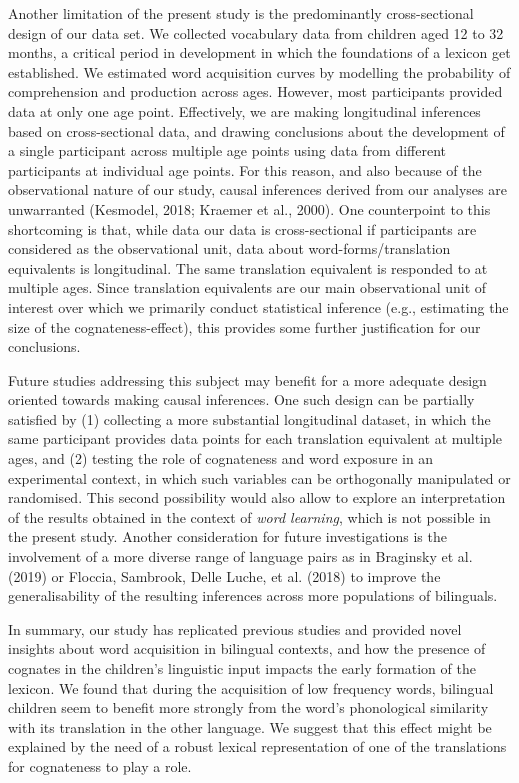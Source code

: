 \documentclass[
  man,
  floatsintext,
  colorlinks=true,linkcolor=blue,citecolor=blue,urlcolor=blue,biblatex]{apa7}
\begin{document}
Another limitation of the present study is the predominantly
cross-sectional design of our data set. We collected vocabulary data
from children aged 12 to 32 months, a critical period in development in
which the foundations of a lexicon get established. We estimated word
acquisition curves by modelling the probability of comprehension and
production across ages. However, most participants provided data at only
one age point. Effectively, we are making longitudinal inferences based
on cross-sectional data, and drawing conclusions about the development
of a single participant across multiple age points using data from
different participants at individual age points. For this reason, and
also because of the observational nature of our study, causal inferences
derived from our analyses are unwarranted (Kesmodel, 2018; Kraemer et
al., 2000). One counterpoint to this shortcoming is that, while data our
data is cross-sectional if participants are considered as the
observational unit, data about word-forms/translation equivalents is
longitudinal. The same translation equivalent is responded to at
multiple ages. Since translation equivalents are our main observational
unit of interest over which we primarily conduct statistical inference
(e.g., estimating the size of the cognateness-effect), this provides
some further justification for our conclusions.

Future studies addressing this subject may benefit for a more adequate
design oriented towards making causal inferences. One such design can be
partially satisfied by (1) collecting a more substantial longitudinal
dataset, in which the same participant provides data points for each
translation equivalent at multiple ages, and (2) testing the role of
cognateness and word exposure in an experimental context, in which such
variables can be orthogonally manipulated or randomised. This second
possibility would also allow to explore an interpretation of the results
obtained in the context of \emph{word learning}, which is not possible
in the present study. Another consideration for future investigations is
the involvement of a more diverse range of language pairs as in
Braginsky et al. (2019) or Floccia, Sambrook, Delle Luche, et al. (2018)
to improve the generalisability of the resulting inferences across more
populations of bilinguals.

In summary, our study has replicated previous studies and provided novel
insights about word acquisition in bilingual contexts, and how the
presence of cognates in the children's linguistic input impacts the
early formation of the lexicon. We found that during the acquisition of
low frequency words, bilingual children seem to benefit more strongly
from the word's phonological similarity with its translation in the
other language. We suggest that this effect might be explained by the
need of a robust lexical representation of one of the translations for
cognateness to play a role.
\end{document}
